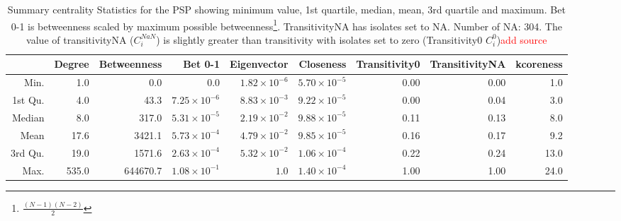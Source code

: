 \begin{table}[ht]
\centering
\begin{adjustbox}{width=\textwidth}

\begin{tabular}{rrrrrrrrr}
  \toprule
 & Degree & Betweenness & Bet 0-1 & Eigenvector & Closeness & Transitivity0 & TransitivityNA & kcoreness \\ 
  \midrule
Min. & 1.0 & 0.0 & $0.0$ & $1.82 \times 10^{-6}$ & $5.70 \times 10^{-5}$ & 0.00 & 0.00 & 1.0 \\ 
  1st Qu. & 4.0 & 43.3 & $7.25 \times 10^{-6}$ & $8.83 \times 10^{-3}$ & $9.22 \times 10^{-5}$ & 0.00 & 0.04 & 3.0 \\ 
  Median & 8.0 & 317.0 & $5.31 \times 10^{-5}$ & $2.19 \times 10^{-2}$ & $9.88 \times 10^{-5}$ & 0.11 & 0.13 & 8.0 \\ 
  Mean & 17.6 & 3421.1 & $5.73 \times 10^{-4}$ & $4.79 \times 10^{-2}$ & $9.85 \times 10^{-5}$ & 0.16 & 0.17 & 9.2 \\ 
  3rd Qu. & 19.0 & 1571.6 & $2.63 \times 10^{-4}$ & $5.32 \times 10^{-2}$ & $1.06 \times 10^{-4}$ & 0.22 & 0.24 & 13.0 \\ 
  Max. & 535.0 & 644670.7 & $1.08 \times 10^{-1}$ & $1.0 $ & $1.40 \times 10^{-4}$ & 1.00 & 1.00 & 24.0 \\ 
   \bottomrule
\end{tabular}
\end{adjustbox}
\caption[Summary centrality statistics]{Summary centrality Statistics for the PSP showing minimum value, 1st quartile, median, mean, 3rd quartile and maximum. Bet 0-1 is betweenness scaled by maximum possible betweenness\footnote{$\frac{(N-1)(N-2)}{2}$}. TransitivityNA has isolates set to NA. Number of NA: 304. The value of transitivityNA ($C_i^{NaN}$) is slightly greater than transitivity with isolates set to zero (Transitivity0 $C_i^0$)\textcolor{red}{add source}} 
\label{Table:Summary of centrality measures1}
\end{table}








